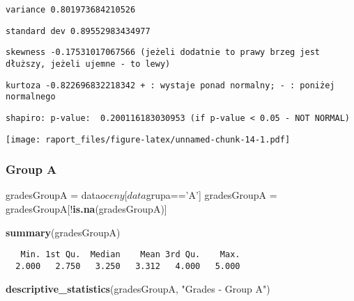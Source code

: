 \documentclass[]{article}
\newenvironment{Shaded}{\begin{snugshade}}{\end{snugshade}}
\newcommand{\KeywordTok}[1]{\textcolor[rgb]{0.13,0.29,0.53}{\textbf{{#1}}}}
\newcommand{\StringTok}[1]{\textcolor[rgb]{0.31,0.60,0.02}{{#1}}}
\newcommand{\NormalTok}[1]{{#1}}
\begin{document}
\begin{verbatim}
variance 0.801973684210526
\end{verbatim}

\begin{verbatim}
standard dev 0.89552983434977
\end{verbatim}

\begin{verbatim}
skewness -0.17531017067566 (jeżeli dodatnie to prawy brzeg jest dłuższy, jeżeli ujemne - to lewy)
\end{verbatim}

\begin{verbatim}
kurtoza -0.822696832218342 + : wystaje ponad normalny; - : poniżej normalnego
\end{verbatim}

\begin{verbatim}
shapiro: p-value:  0.200116183030953 (if p-value < 0.05 - NOT NORMAL)
\end{verbatim}

\texttt{[image: raport\_files/figure-latex/unnamed-chunk-14-1.pdf]}

\subsubsection{Group A}\label{group-a-1}

\begin{Shaded}
\begin{Highlighting}[]
\NormalTok{gradesGroupA =}\StringTok{ }\NormalTok{data$oceny[data$grupa==}\StringTok{'A'}\NormalTok{]}
\NormalTok{gradesGroupA =}\StringTok{ }\NormalTok{gradesGroupA[!}\KeywordTok{is.na}\NormalTok{(gradesGroupA)]}
\end{Highlighting}
\end{Shaded}

\begin{Shaded}
\begin{Highlighting}[]
\KeywordTok{summary}\NormalTok{(gradesGroupA)}
\end{Highlighting}
\end{Shaded}

\begin{verbatim}
   Min. 1st Qu.  Median    Mean 3rd Qu.    Max. 
  2.000   2.750   3.250   3.312   4.000   5.000 
\end{verbatim}

\begin{Shaded}
\begin{Highlighting}[]
\KeywordTok{descriptive_statistics}\NormalTok{(gradesGroupA, }\StringTok{"Grades - Group  A"}\NormalTok{)}
\end{Highlighting}
\end{Shaded}
\end{document}
